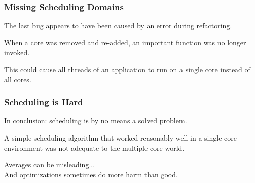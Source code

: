 \begin{frame}
\frametitle{Missing Scheduling Domains}

The last bug appears to have been caused by an error during refactoring. 

When a core was removed and re-added, an important function was no longer invoked.

This could cause all threads of an application to run on a single core instead of all cores. 

\end{frame}



\begin{frame}
\frametitle{Scheduling is Hard}

In conclusion: scheduling is by no means a solved problem. 

A simple scheduling algorithm that worked reasonably well in a single core environment was not adequate to the multiple core world. 

Averages can be misleading...\\
\quad And optimizations sometimes do more harm than good. 

\end{frame}



